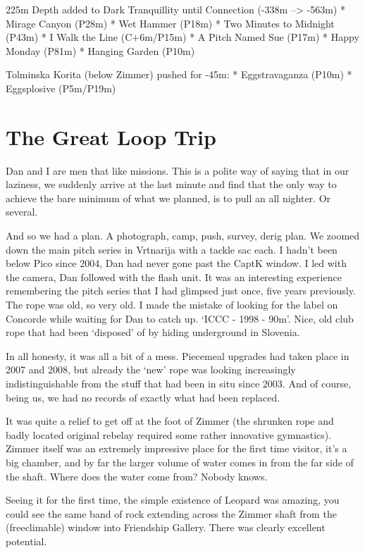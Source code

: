 225m Depth added to Dark Tranquillity until Connection (-338m
--\textgreater{} -563m) * Mirage Canyon (P28m) * Wet Hammer (P18m) * Two
Minutes to Midnight (P43m) * I Walk the Line (C+6m/P15m) * A Pitch Named
Sue (P17m) * Happy Monday (P81m) * Hanging Garden (P10m)

Tolminska Korita (below Zimmer) pushed for -45m: * Eggstravaganza (P10m)
* Eggsplosive (P5m/P19m)

\hypertarget{the-great-loop-trip}{%
\section{The Great Loop Trip}\label{the-great-loop-trip}}

Dan and I are men that like missions. This is a polite way of saying
that in our laziness, we suddenly arrive at the last minute and find
that the only way to achieve the bare minimum of what we planned, is to
pull an all nighter. Or several.

And so we had a plan. A photograph, camp, push, survey, derig plan. We
zoomed down the main pitch series in Vrtnarija with a tackle sac each. I
hadn't been below Pico since 2004, Dan had never gone past the CaptK
window. I led with the camera, Dan followed with the flash unit. It was
an interesting experience remembering the pitch series that I had
glimpsed just once, five years previously. The rope was old, so very
old. I made the mistake of looking for the label on Concorde while
waiting for Dan to catch up. `ICCC - 1998 - 90m'. Nice, old club rope
that had been `disposed' of by hiding underground in Slovenia.

In all honesty, it was all a bit of a mess. Piecemeal upgrades had taken
place in 2007 and 2008, but already the `new' rope was looking
increasingly indistinguishable from the stuff that had been in situ
since 2003. And of course, being us, we had no records of exactly what
had been replaced.

It was quite a relief to get off at the foot of Zimmer (the shrunken
rope and badly located original rebelay required some rather innovative
gymnastics). Zimmer itself was an extremely impressive place for the
first time visitor, it's a big chamber, and by far the larger volume of
water comes in from the far side of the shaft. Where does the water come
from? Nobody knows.

Seeing it for the first time, the simple existence of Leopard was
amazing, you could see the same band of rock extending across the Zimmer
shaft from the (freeclimable) window into Friendship Gallery. There was
clearly excellent potential.

